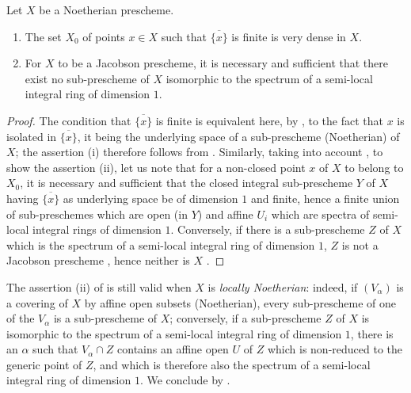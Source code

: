 \begin{proposition}[10.5.5]
\label{IV.10.5.5}
Let $X$ be a Noetherian prescheme.
\begin{enumerate}[label=\textup{(\roman*)}]
  \item The set $X_0$ of points $x\in X$ such that $\overline{\{x\}}$ is finite is very dense in $X$.
  \item For $X$ to be a Jacobson prescheme, it is necessary and sufficient that there exist no sub-prescheme of $X$ isomorphic to the spectrum of a semi-local integral ring of dimension $1$.
\end{enumerate}
\end{proposition}

\begin{proof}
The condition that $\overline{\{x\}}$ is finite is equivalent here, by , to the fact that $x$ is isolated in $\overline{\{x\}}$, it being the underlying space of a sub-prescheme (Noetherian) of $X$; the assertion (i) therefore follows from .
Similarly, taking into account , to show the assertion (ii), let us note that for a non-closed point $x$ of $X$ to belong to $X_0$, it is necessary and sufficient that the closed integral sub-prescheme $Y$ of $X$ having $\overline{\{x\}}$ as underlying space be of dimension $1$ and finite, hence a finite union of sub-preschemes which are open (in $Y$) and affine $U_i$ which are spectra of semi-local integral rings of dimension $1$.
Conversely, if there is a sub-prescheme $Z$ of $X$ which is the spectrum of a semi-local integral ring of dimension $1$, $Z$ is not a Jacobson prescheme , hence neither is $X$ .
\end{proof}


\begin{remark}[10.5.6]
\label{IV.10.5.6}
The assertion (ii) of  is still valid when $X$ is \emph{locally Noetherian}: indeed, if $(V_\alpha)$ is a covering of $X$ by affine open subsets (Noetherian), every sub-prescheme of one of the $V_\alpha$ is a sub-prescheme of $X$; conversely, if a sub-prescheme $Z$ of $X$ is isomorphic to the spectrum of a semi-local integral ring of dimension $1$, there is an $\alpha$ such that $V_\alpha\cap Z$ contains an affine open $U$ of $Z$ which is non-reduced to the generic point of $Z$, and which is therefore also the spectrum of a semi-local integral ring of dimension $1$.
We conclude by .
\end{remark}

